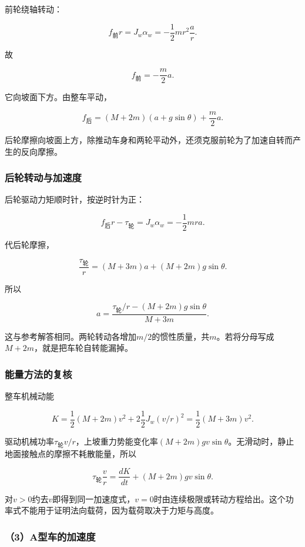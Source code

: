 \documentclass[12pt,a4paper,fontset=fandol]{ctexart}
\begin{document}
前轮绕轴转动：

\[
f_{\text{前}}r=J_w\alpha_w
=-\frac12mr^2\frac ar.
\]

故

\[
\boxed{f_{\text{前}}=-\frac m2a}.
\]

它向坡面下方。由整车平动，

\[
\boxed{
f_{\text{后}}=(M+2m)(a+g\sin\theta)+\frac m2a}.
\]

后轮摩擦向坡面上方，除推动车身和两轮平动外，还须克服前轮为了加速自转而产生的反向摩擦。

\subsubsection{后轮转动与加速度}\label{ux540eux8f6eux8f6cux52a8ux4e0eux52a0ux901fux5ea6}

后轮驱动力矩顺时针，按逆时针为正：

\[
f_{\text{后}}r-\tau_{\text{轮}}
=J_w\alpha_w=-\frac12mra.
\]

代后轮摩擦，

\[
\frac{\tau_{\text{轮}}}r=(M+3m)a+(M+2m)g\sin\theta.
\]

所以

\[
\boxed{
a=\frac{\tau_{\text{轮}}/r-(M+2m)g\sin\theta}
{M+3m}}.
\]

这与参考解答相同。两轮转动各增加\(m/2\)的惯性质量，共\(m\)。若将分母写成\(M+2m\)，就是把车轮自转能漏掉。

\subsubsection{能量方法的复核}\label{ux80fdux91cfux65b9ux6cd5ux7684ux590dux6838}

整车机械动能

\[
K=\frac12(M+2m)v^2
+2\frac12J_w(v/r)^2
=\frac12(M+3m)v^2.
\]

驱动机械功率\(\tau_{\text{轮}}v/r\)，上坡重力势能变化率\((M+2m)g v\sin\theta\)。无滑动时，静止地面接触点的摩擦不耗散能量，所以

\[
\tau_{\text{轮}}\frac vr
=\frac{dK}{dt}+(M+2m)g v\sin\theta.
\]

对\(v>0\)约去\(v\)即得到同一加速度式，\(v=0\)时由连续极限或转动方程给出。这个功率式不能用于证明法向载荷，因为载荷取决于力矩与高度。

\subsubsection{（3）A型车的加速度}\label{aux578bux8f66ux7684ux52a0ux901fux5ea6}
\end{document}

